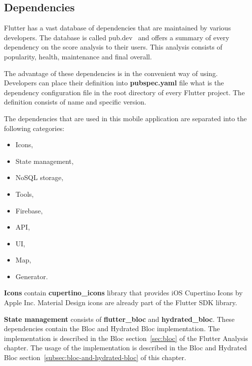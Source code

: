 \subsection{Dependencies}\label{subsec:dependencies}
Flutter has a vast database of dependencies that are maintained by various developers.
The database is called pub.dev~\cite{pubDev} and offers a summary of every dependency on the score analysis to their users.
This analysis consists of popularity, health, maintenance and final overall.

The advantage of these dependencies is in the convenient way of using.
Developers can place their definition into \textbf{pubspec.yaml} file what is the dependency configuration file in the root directory of every Flutter project.
The definition consists of name and specific version.

The dependencies that are used in this mobile application are separated into the following categories:
\begin{itemize}
    \item Icons,
    \item State management,
    \item NoSQL storage,
    \item Tools,
    \item Firebase,
    \item API,
    \item UI,
    \item Map,
    \item Generator.
\end{itemize}

\textbf{Icons} contain \textbf{cupertino\_icons} library that provides iOS Cupertino Icons by Apple Inc.
Material Design icons are already part of the Flutter SDK library.

\textbf{State management} consists of \textbf{flutter\_bloc} and \textbf{hydrated\_bloc}.
These dependencies contain the Bloc and Hydrated Bloc implementation.
The implementation is described in the Bloc section~\ref{sec:bloc} of the Flutter Analysis chapter.
The usage of the implementation is described in the Bloc and Hydrated Bloc section~\ref{subsec:bloc-and-hydrated-bloc} of this chapter.

